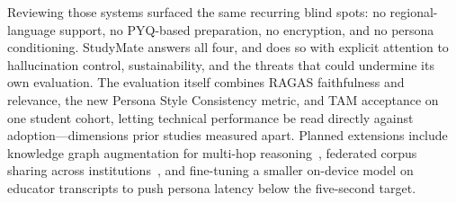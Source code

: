 \documentclass[conference]{IEEEtran}
\begin{document}
Reviewing those systems surfaced the same recurring blind spots: no
regional-language support, no PYQ-based preparation, no encryption, and
no persona conditioning. StudyMate answers all four, and does so with
explicit attention to hallucination control, sustainability, and the
threats that could undermine its own evaluation. The evaluation itself
combines RAGAS faithfulness and relevance, the new Persona Style
Consistency metric, and TAM acceptance on one student cohort, letting
technical performance be read directly against adoption---dimensions
prior studies measured apart. Planned extensions include knowledge
graph augmentation for multi-hop reasoning~\cite{dong2025}, federated
corpus sharing across institutions~\cite{fajardo2025}, and fine-tuning
a smaller on-device model on educator transcripts to push persona
latency below the five-second target.
\end{document}

